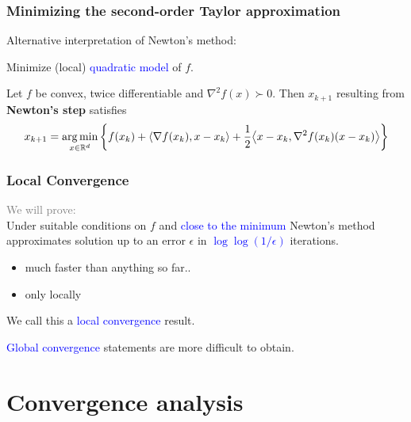 \documentclass[aspectratio=149]{beamer}
\begin{document}
\begin{frame}
  \frametitle{Minimizing the second-order Taylor approximation}
  Alternative interpretation of Newton's method:\\
  \begin{block}{}
    \center
    Minimize (local) \textcolor{blue}{quadratic model} of $f$.
  \end{block}
  \begin{lemma}%
    Let $f$ be convex, twice differentiable and $\nabla^2 f(x) \succ 0$. Then $x_{k+1}$ resulting from \textbf{Newton's step} satisfies
    \begin{equation}
      x_{k+1} = \operatorname*{arg\,min}_{x \in \mathbb{R}^d} \left\{f(x_k) + \langle \nabla f(x_k), x-x_k \rangle + \frac12 \big \langle x-x_k, \nabla^2 f(x_k) (x-x_k)  \big\rangle \right\}
    \end{equation}
  \end{lemma}
\end{frame}


\begin{frame}
  \frametitle{Local Convergence}
  \textcolor{gray}{We will prove:}\\
  Under suitable conditions on $f$ and \textcolor{blue}{close to the minimum} Newton's method approximates solution up to an error $\epsilon$ in \textcolor{blue}{$\log \log (1/\epsilon)$} iterations.
  \begin{itemize}
    \item much faster than anything so far..
    \item only locally
  \end{itemize}
  \begin{block}{}
    We call this a \textcolor{blue}{local convergence} result.\\
  \end{block}

  \textcolor{blue}{Global convergence} statements are more difficult to obtain.
\end{frame}


\section{Convergence analysis}%
\end{document}
